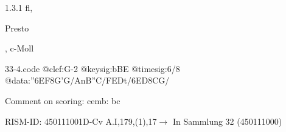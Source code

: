 \documentclass[a4paper, twocolumn, 11pt]{book}
\begin{document}
\par 1.3.1  fl, \begin{itshape}Presto\end{itshape}, c-Moll  
\begin{filecontents*}{33-4.code}
@clef:G-2
@keysig:bBE
@timesig:6/8
@data:''{6EF8G'G}/{AnB''C}/{FEDt}/{6ED8CG}/
\end{filecontents*}
\newline %
\par Comment on scoring: cemb: bc
\par RISM-ID: 450111001\newline D-Cv  A.I,179,(1),17\newline $\rightarrow$ In Sammlung 32 (450111000)
      
\end{document}
